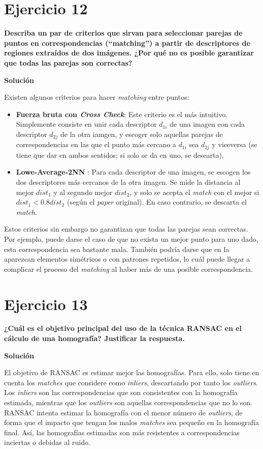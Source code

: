 \documentclass[11pt,a4paper]{article}
\newcommand{\answer}{\noindent\textbf{Solución}}
\newcommand{\question}[1]{\noindent\textbf{#1}}
\newcommand{\nonumsection}[1]{\section*{#1}\addcontentsline{toc}{section}{#1}}
\begin{document}
\nonumsection{Ejercicio 12}

\question{Describa un par de criterios que sirvan para seleccionar
parejas de puntos en correspondencias (``matching'') a partir de
descriptores de regiones extraídos de dos imágenes. ¿Por qué no es
posible garantizar que todas las parejas son correctas?}

\answer

Existen algunos criterios para hacer \textit{matching} entre puntos:

\begin{itemize}[label=\textbullet]
	\item \textbf{Fuerza bruta con \textit{Cross Check}}: Este criterio es
	el más intuitivo. Simplemente consiste en unir cada descriptor $d_{1i}$ de una imagen
	con cada descriptor $d_{2j}$ de la otra iamgen, y escoger solo aquellas parejas
	de correspondencias en las que el punto más cercano a $d_{1i}$ sea $d_{2j}$ y viceversa
	(se tiene que dar en ambos sentidos; si solo se da en uno, se descarta).
	\item \textbf{Lowe-Average-2NN }: Para cada descriptor de una imagen, se escogen
	los dos descriptores más cercanos de la otra imagen. Se mide la distancia al
	mejor $dist_1$ y al segundo mejor $dist_2$, y solo se acepta el \textit{match} con
	el mejor si $dist_1 < 0.8dist_2$ (según el \textit{paper} original). En caso contrario,
	se descarta el \textit{match}.
\end{itemize}

Estos criterios sin embargo no garantizan que todas las parejas sean
correctas. Por ejemplo, puede darse el caso de que no exista un mejor
punto para uno dado, esta correspondencia sea bastante mala. También podría darse
que en la aparezcan elementos simétricos o con patrones repetidos, lo cuál
puede llegar a complicar el proceso del \textit{matching} al haber más de
una posible correspondencia.

\nonumsection{Ejercicio 13}

\question{¿Cuál es el objetivo principal del uso de la técnica RANSAC en
el cálculo de una homografía? Justificar la respuesta.}

\answer

El objetivo de RANSAC es estimar mejor las homografías. Para ello, solo tiene
en cuenta los \textit{matches} que considere como \textit{inliers}, descartando
por tanto los \textit{outliers}. Los \textit{inliers} son las correspondencias
que son consistentes con la homografía estimada, mientras que los \textit{outliers}
son aquellas correspondencias que no lo son. RANSAC intenta estimar la homografía
con el menor número de \textit{outliers}, de forma que el impacto que tengan los
malos \textit{matches} sea pequeño en la homografía final. Así, las homografías
estimadas son más resistentes a correspondencias inciertas o debidas al ruido.
\end{document}
